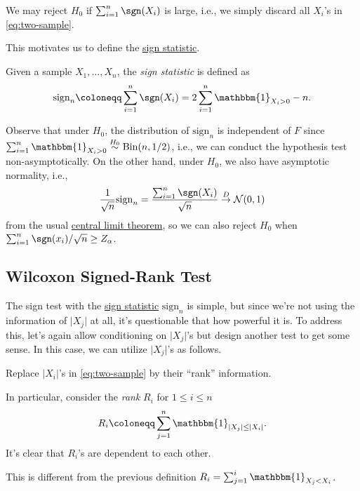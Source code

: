 \begin{intuition}
	We may reject \(H_0\) if \(\sum_{i=1}^{n} \sgn (X_i) \) is large, i.e., we simply discard all \(X_i\)'s in \autoref{eq:two-sample}.
\end{intuition}

This motivates us to define the \hyperref[def:sign-statistic]{sign statistic}.

\begin{definition}\label{def:sign-statistic}
	Given a sample \(X_1, \dots , X_n\), the \emph{sign statistic} is defined as
	\[
		\mathrm{sign} _n
		\coloneqq \sum_{i=1}^{n} \sgn (X_i)
		= 2 \sum_{i=1}^{n} \mathbbm{1}_{X_i > 0} - n .
	\]
\end{definition}

Observe that under \(H_0\), the distribution of \(\mathrm{sign} _n\) is independent of \(F\) since \(\sum_{i=1}^{n} \mathbbm{1}_{X_i > 0} \overset{H_0}{\sim} \operatorname{Bin}(n, 1 / 2)\), i.e., we can conduct the hypothesis test non-asymptotically. On the other hand, under \(H_0\), we also have asymptotic normality, i.e.,
\[
	\frac{1}{\sqrt{n} } \mathrm{sign} _n
	= \frac{\sum_{i=1}^{n} \sgn (X_i)}{\sqrt{n} }
	\overset{D}{\to} \mathcal{N} (0, 1)
\]
from the usual \hyperref[thm:CLT]{central limit theorem}, so we can also reject \(H_0\) when \(\sum_{i=1}^{n} \sgn (x_i) / \sqrt{n} \geq Z_\alpha \).

\subsection{Wilcoxon Signed-Rank Test}
The sign test with the \hyperref[def:sign-statistic]{sign statistic} \(\mathrm{sign} _n\) is simple, but since we're not using the information of \(\vert X_j \vert \) at all, it's questionable that how powerful it is. To address this, let's again allow conditioning on \(\lvert X_j \rvert \)'s but design another test to get some sense. In this case, we can utilize \(\vert X_j \vert \)'s as follows.

\begin{intuition}
	Replace \(\vert X_i \vert \)'s in \autoref{eq:two-sample} by their ``rank'' information.
\end{intuition}

In particular, consider the \emph{rank} \(R_i\) for \(1 \leq i \leq n\)
\[
	R_i
	\coloneqq \sum_{j=1}^{n} \mathbbm{1}_{\vert X_j \vert \leq \vert X_i \vert }.
\]
It's clear that \(R_i\)'s are dependent to each other.

\begin{prev}
	This is different from the previous definition \(R_i = \sum_{j=1}^{i} \mathbbm{1}_{X_j < X_i} \).
\end{prev}


